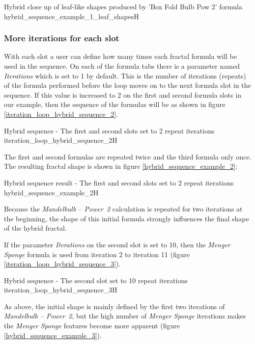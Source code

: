 {Hybrid close up of leaf-like shapes produced by 'Box Fold Bulb Pow 2' formula}
{hybrid_sequence_example_1_leaf_shapes}{H}

\subsubsection{More iterations for each slot}

With each slot a user can define how many times each fractal formula will be used in the sequence.
On each of the formula tabs there is a parameter named \emph{Iterations} which is set to 1 by default.
This is the number of iterations (repeats) of the formula performed before the loop moves on to the next formula slot in the sequence. If this value is increased to 2 on the first and second formula slots in our example,
then the sequence of the formulas will be as shown in figure \ref{iteration_loop_hybrid_sequence_2}. \label{two-iterations-per-slot}

{Hybrid sequence - The first and second slots set to 2 repeat iterations}
{iteration_loop_hybrid_sequence_2}{H}

The first and second formulas are repeated twice and the third formula only once.
The resulting fractal shape is shown in figure \ref{hybrid_sequence_example_2}:

{Hybrid sequence result - The first and second slots set to 2 repeat iterations}
{hybrid_sequence_example_2}{H}

Because the \emph{Mandelbulb -- Power~2} calculation is repeated for two iterations at the beginning, the shape of this initial formula strongly influences the final shape of the hybrid fractal.

If the parameter \emph{Iterations} on the second slot is set to 10,
then the \emph{Menger Sponge} formula is used from iteration 2 to iteration 11 (figure \ref{iteration_loop_hybrid_sequence_3}).

{Hybrid sequence - The second slot set to 10 repeat iterations}
{iteration_loop_hybrid_sequence_3}{H}

As above, the initial shape is mainly defined by the first two iterations of \emph{Mandelbulb -- Power~2},
but the high number of \emph{Menger Sponge} iterations makes the \emph{Menger Sponge} features become more apparent (figure \ref{hybrid_sequence_example_3}).

